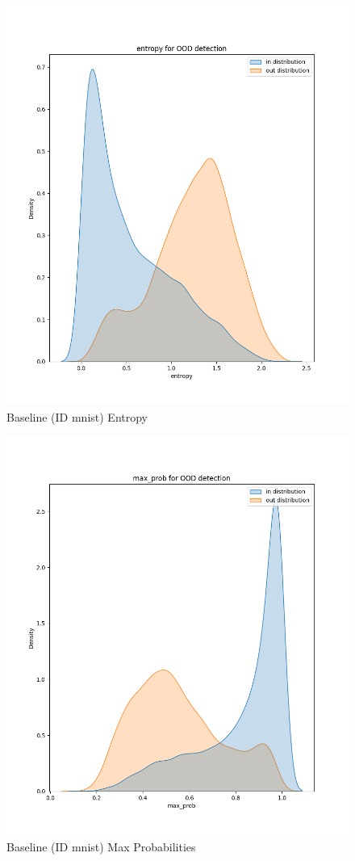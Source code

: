 \documentclass[11pt]{article}
\begin{document}
\begin{figure}[htbp]
\centering
\includegraphics[width=.9\linewidth]{./base_mnist_entropy.png}
\caption{\label{fig:orgdeb9a27}
Baseline (ID mnist) Entropy}
\end{figure}

\begin{figure}[htbp]
\centering
\includegraphics[width=.9\linewidth]{./base_mnist_max_prob.png}
\caption{\label{fig:org9621000}
Baseline (ID mnist) Max Probabilities}
\end{figure}
\end{document}
